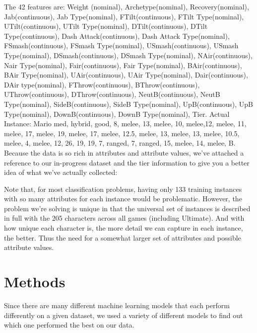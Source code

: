 \documentclass{article}
\begin{document}
The 42 features are: 
Weight (nominal), Archetype(nominal), Recovery(nominal), Jab(continuous), Jab Type(nominal), FTilt(continuous), FTilt Type(nominal), UTilt(continuous), UTilt Type(nominal), DTilt(continuous), DTilt Type(continuous), Dash Attack(continuous), Dash Attack Type(nominal), FSmash(continuous), FSmash Type(nominal), USmash(continuous), USmash Type(nominal), DSmash(continuous), DSmash Type(nominal), NAir(continuous), Nair Type(nominal), Fair(continuous), Fair Type(nominal), BAir(continuous), BAir Type(nominal), UAir(continuous), UAir Type(nominal), Dair(continuous), DAir type(nominal), FThrow(continuous), BThrow(continuous), UThrow(continuous), DThrow(continuous), NeutB(continuous), NeutB Type(nominal), SideB(continuous), SideB Type(nominal), UpB(continuous), UpB Type(nominal), DownB(continuous), DownB Type(nominal), Tier.    
\linebreak
Actual Instance: Mario
med, hybrid, good, 8, melee, 13, melee, 10, melee,12, melee, 11, melee, 17, melee, 19, melee, 17, melee, 12.5, melee, 13, melee, 13, melee, 10.5, melee,  4,  melee, 12, 26, 19, 19, 7, ranged, 7, ranged, 15, melee, 14, melee, B.
Because the data is so rich in attributes and attribute values, we’ve attached a reference to our in-progress dataset  and the tier information to give you a better idea of what we’ve actually collected:
Note that, for most classification problems, having only 133 training instances with so many attributes for each instance would be problematic. However, the problem we’re solving is unique in that the universal set of instances is described in full with the 205 characters across all games (including Ultimate). And with how unique each character is, the more detail we can capture in each instance, the better. Thus the need for a somewhat larger set of attributes and possible attribute values. 

\section{Methods}

Since there are many different machine learning models that each perform differently on a given dataset, we used a variety of different models to find out which one performed the best on our data.
\end{document}
